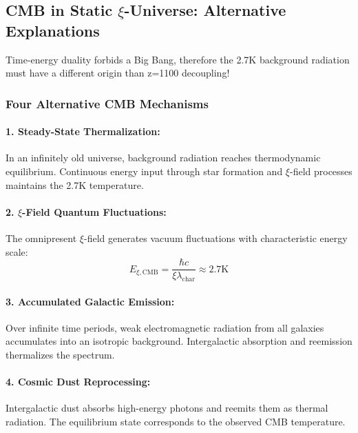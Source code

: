 \documentclass[12pt,a4paper]{article}
\theoremstyle{definition}
\begin{document}
	\subsection{CMB in Static $\xi$-Universe: Alternative Explanations}
	
	\begin{revolutionary}
		Time-energy duality forbids a Big Bang, therefore the 2.7K background radiation must have a different origin than z=1100 decoupling!
	\end{revolutionary}
	
	\subsubsection{Four Alternative CMB Mechanisms}
	
	\paragraph{1. Steady-State Thermalization:}
	In an infinitely old universe, background radiation reaches thermodynamic equilibrium. Continuous energy input through star formation and $\xi$-field processes maintains the 2.7K temperature.
	
	\paragraph{2. $\xi$-Field Quantum Fluctuations:}
	The omnipresent $\xi$-field generates vacuum fluctuations with characteristic energy scale:
	\begin{equation}
		E_{\xi,\text{CMB}} = \frac{\hbar c}{\xi \lambda_{\text{char}}} \approx \text{2.7K}
	\end{equation}
	
	\paragraph{3. Accumulated Galactic Emission:}
	Over infinite time periods, weak electromagnetic radiation from all galaxies accumulates into an isotropic background. Intergalactic absorption and reemission thermalizes the spectrum.
	
	\paragraph{4. Cosmic Dust Reprocessing:}
	Intergalactic dust absorbs high-energy photons and reemits them as thermal radiation. The equilibrium state corresponds to the observed CMB temperature.
	
\end{document}

